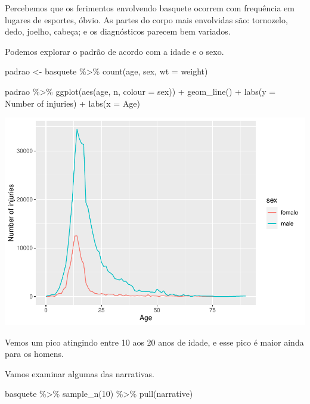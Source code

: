 \documentclass[
]{book}
\newenvironment{Shaded}{\begin{snugshade}}{\end{snugshade}}
\newcommand{\AttributeTok}[1]{\textcolor[rgb]{0.77,0.63,0.00}{#1}}
\newcommand{\DecValTok}[1]{\textcolor[rgb]{0.00,0.00,0.81}{#1}}
\newcommand{\FunctionTok}[1]{\textcolor[rgb]{0.00,0.00,0.00}{#1}}
\newcommand{\NormalTok}[1]{#1}
\newcommand{\OtherTok}[1]{\textcolor[rgb]{0.56,0.35,0.01}{#1}}
\newcommand{\SpecialCharTok}[1]{\textcolor[rgb]{0.00,0.00,0.00}{#1}}
\newcommand{\StringTok}[1]{\textcolor[rgb]{0.31,0.60,0.02}{#1}}
\begin{document}
Percebemos que os ferimentos envolvendo basquete ocorrem com frequência em lugares de esportes, óbvio. As partes do corpo mais envolvidas são: tornozelo, dedo, joelho, cabeça; e os diagnósticos parecem bem variados.

Podemos explorar o padrão de acordo com a idade e o sexo.

\begin{Shaded}
\begin{Highlighting}[]
\NormalTok{padrao }\OtherTok{\textless{}{-}}\NormalTok{ basquete }\SpecialCharTok{\%\textgreater{}\%} 
  \FunctionTok{count}\NormalTok{(age, sex, }\AttributeTok{wt =}\NormalTok{ weight)}

\NormalTok{padrao }\SpecialCharTok{\%\textgreater{}\%} 
  \FunctionTok{ggplot}\NormalTok{(}\FunctionTok{aes}\NormalTok{(age, n, }\AttributeTok{colour =}\NormalTok{ sex)) }\SpecialCharTok{+} 
  \FunctionTok{geom\_line}\NormalTok{() }\SpecialCharTok{+} 
  \FunctionTok{labs}\NormalTok{(}\AttributeTok{y =} \StringTok{\textquotesingle{}Number of injuries\textquotesingle{}}\NormalTok{) }\SpecialCharTok{+}
  \FunctionTok{labs}\NormalTok{(}\AttributeTok{x =} \StringTok{\textquotesingle{}Age\textquotesingle{}}\NormalTok{)}
\end{Highlighting}
\end{Shaded}

\includegraphics{Tutorial-Shiny_files/figure-latex/unnamed-chunk-42-1.pdf}

Vemos um pico atingindo entre 10 aos 20 anos de idade, e esse pico é maior ainda para os homens.

Vamos examinar algumas das narrativas.

\begin{Shaded}
\begin{Highlighting}[]
\NormalTok{basquete }\SpecialCharTok{\%\textgreater{}\%} 
  \FunctionTok{sample\_n}\NormalTok{(}\DecValTok{10}\NormalTok{) }\SpecialCharTok{\%\textgreater{}\%} 
  \FunctionTok{pull}\NormalTok{(narrative)}
\end{Highlighting}
\end{Shaded}
\end{document}
